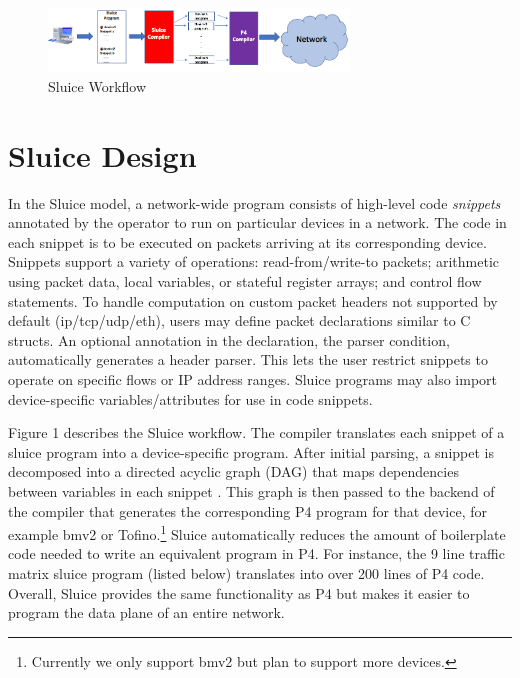 \begin{figure}[tp]
\centering
\includegraphics[width=80mm,scale=0.7]{figures/sluice_workflow.png}
\caption{Sluice Workflow}
\end{figure}

\section{Sluice Design}
In the Sluice model, a network-wide program consists of high-level code
\textit{snippets} annotated by the operator to run on particular devices in a
network. The code in each snippet is to be executed on packets arriving at its
corresponding device. Snippets support a variety of operations:
read-from/write-to packets; arithmetic using packet data, local variables, or
stateful register arrays; and control flow statements. To handle computation on
custom packet headers not supported by default (ip/tcp/udp/eth), users may
define packet declarations similar to C structs. An optional annotation in the
declaration, the parser condition, automatically generates a header parser.
This lets the user restrict snippets to operate on specific flows or IP address
ranges. Sluice programs may also import device-specific variables/attributes
for use in code snippets.

Figure 1 describes the Sluice workflow. The compiler translates each snippet of
a sluice program into a device-specific program. After initial parsing, a
snippet is decomposed into a directed acyclic graph (DAG) that maps
dependencies between variables in each snippet . This
graph is then passed to the backend of the compiler that generates the
corresponding P4 program for that device, for example bmv2 or
Tofino.\footnote{Currently we only support bmv2 but plan to support more
devices.} Sluice automatically reduces the amount of boilerplate code needed to
write an equivalent program in P4. For instance, the 9 line traffic matrix
sluice program (listed below) translates into over 200 lines of P4 code.
Overall, Sluice provides the same functionality as P4 but makes it easier to
program the data plane of an entire network. 

